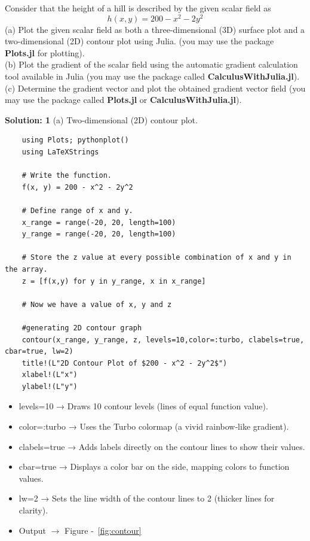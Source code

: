 \documentclass{homework}
\begin{document}
\question  Consider that the height of a hill is described by the given scalar field as 
\[
h(x,y) = 200 - x^2 - 2y^2 
\]
 (a) Plot the given scalar field as both a three-dimensional (3D) surface plot and a two-dimensional (2D)
 contour plot using Julia. (you may use the package \textbf{Plots.jl} for plotting).\\
 (b) Plot the gradient of the scalar field using the automatic gradient calculation tool available in Julia
 (you may use the package called \textbf{CalculusWithJulia.jl}).\\
 (c) Determine the gradient vector and plot the obtained gradient vector field (you may use the package
 called \textbf{Plots.jl} or \textbf{CalculusWithJulia.jl}).

\begin{solution}
    \textbf{Solution: 1}
    (a) Two-dimensional (2D) contour plot.
    \begin{verbatim}
    using Plots; pythonplot()
    using LaTeXStrings
    
    # Write the function.
    f(x, y) = 200 - x^2 - 2y^2
    
    # Define range of x and y.
    x_range = range(-20, 20, length=100)
    y_range = range(-20, 20, length=100)
    
    # Store the z value at every possible combination of x and y in the array.
    z = [f(x,y) for y in y_range, x in x_range]

    # Now we have a value of x, y and z

    #generating 2D contour graph
    contour(x_range, y_range, z, levels=10,color=:turbo, clabels=true, cbar=true, lw=2)
    title!(L"2D Contour Plot of $200 - x^2 - 2y^2$")
    xlabel!(L"x")
    ylabel!(L"y")
    \end{verbatim}
    
    \begin{itemize}
        \item levels=10 → Draws 10 contour levels (lines of equal function value).
        \item color=:turbo → Uses the Turbo colormap (a vivid rainbow‑like gradient).
        \item clabels=true → Adds labels directly on the contour lines to show their values.
        \item cbar=true → Displays a color bar on the side, mapping colors to function values.
        \item lw=2 → Sets the line width of the contour lines to 2 (thicker lines for clarity).
        \item Output $\rightarrow$ Figure -~\ref{fig:contour}
    \end{itemize}
    

\end{solution}
\end{document}
